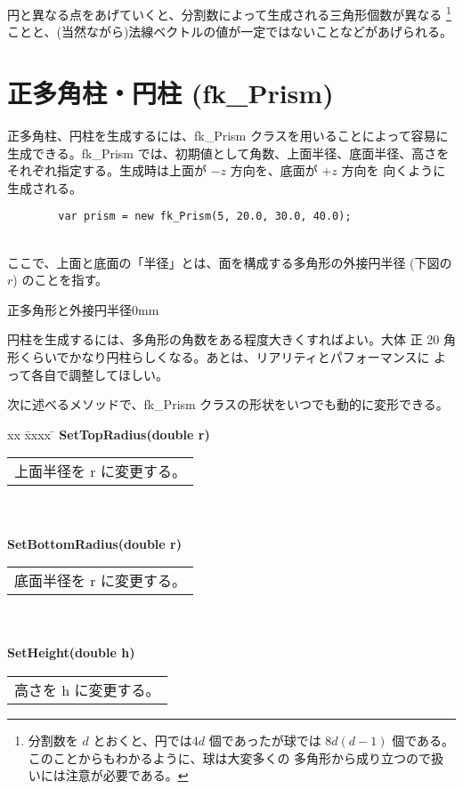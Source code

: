 円と異なる点をあげていくと、分割数によって生成される三角形個数が異なる
\footnote{分割数を \(d\) とおくと、円では\(4d\) 個であったが球では
\(8d(d-1)\) 個である。このことからもわかるように、球は大変多くの
多角形から成り立つので扱いには注意が必要である。}
ことと、(当然ながら)法線ベクトルの値が一定ではないことなどがあげられる。

\section{正多角柱・円柱 (fk\_Prism)}
正多角柱、円柱を生成するには、fk\_Prism クラスを用いることによって容易に
生成できる。fk\_Prism では、初期値として角数、上面半径、底面半径、高さを
それぞれ指定する。生成時は上面が \(-z\) 方向を、底面が \(+z\) 方向を
向くように生成される。
\\
\begin{screen}
\begin{verbatim}
        var prism = new fk_Prism(5, 20.0, 30.0, 40.0);
\end{verbatim}
\end{screen}
~ \\
ここで、上面と底面の「半径」とは、面を構成する多角形の外接円半径
(下図の \(r\)) のことを指す。

	{正多角形と外接円半径}{0mm}

円柱を生成するには、多角形の角数をある程度大きくすればよい。大体
正 20 角形くらいでかなり円柱らしくなる。あとは、リアリティとパフォーマンスに
よって各自で調整してほしい。

次に述べるメソッドで、fk\_Prism クラスの形状をいつでも動的に変形できる。
\begin{tabbing}
xx \= xxxx \= \kill
\> \textbf{SetTopRadius(double r)} \\
	\> \> \begin{tabular}{p{15cm}}
		上面半径を r に変更する。
	\end{tabular} \\ \\

\> \textbf{SetBottomRadius(double r)} \\
	\> \> \begin{tabular}{p{15cm}}
		底面半径を r に変更する。
	\end{tabular} \\ \\

\> \textbf{SetHeight(double h)} \\
	\> \> \begin{tabular}{p{15cm}}
		高さを h に変更する。
	\end{tabular}
\end{tabbing}

